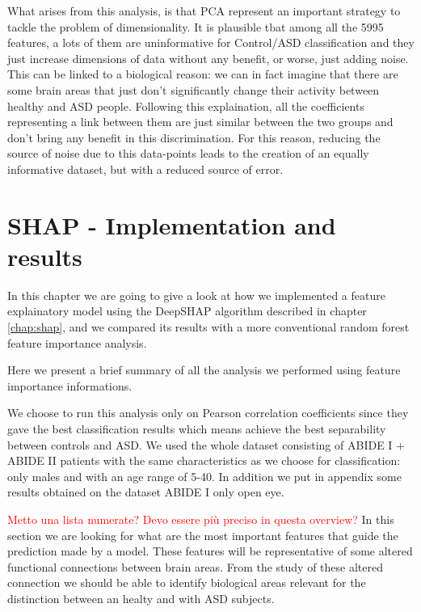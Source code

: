 \documentclass[11pt]{report}
\begin{document}
What arises from this analysis, is that PCA represent an important strategy to tackle the problem of dimensionality.
It is plausible tbat among all the 5995 features, a lots of them are uninformative for Control/ASD classification and they just increase dimensions of data without any benefit, or worse, just adding noise.
This can be linked to a biological reason: we can in fact imagine that there are some brain areas that just don't significantly change their activity between healthy and ASD people.
Following this explaination, all the coefficients representing a link between them are just similar between the two groups and don't bring any benefit in this discrimination.
For this reason, reducing the source of noise due to this data-points leads to the creation of an equally informative dataset, but with a reduced source of error.

\newpage


\chapter{SHAP - Implementation and results}\label{chap:shap_results}

In this chapter we are going to give a look at how we implemented a feature explainatory model using the DeepSHAP algorithm described in chapter \ref{chap:shap}, and we compared its results with a more conventional random forest feature importance analysis.

Here we present a brief summary of all the analysis we performed using feature importance informations.

We choose to run this analysis only on Pearson correlation coefficients since they gave the best classification results which means achieve the best separability between controls and ASD.
We used the whole dataset consisting of ABIDE I + ABIDE II patients with the same characteristics as we choose for classification: only males and with an age range of 5-40.
In addition we put in appendix some results obtained on the dataset ABIDE I only open eye.

\textcolor{red}{Metto una lista numerate? Devo essere più preciso in questa overview?}
In this section we are looking for what are the most important features that guide the prediction made by a model.
These features will be representative of some altered functional connections between brain areas.
From the study of these altered connection we should be able to identify biological areas relevant for the distinction between an healty and with ASD subjects.
\end{document}
